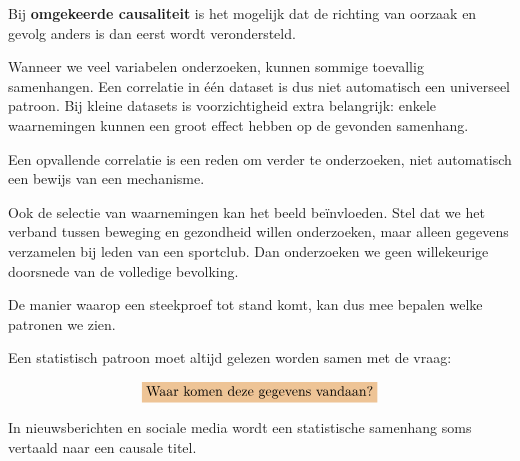 \documentclass{ximera}
\begin{document}
\begin{definitie}
Bij \textbf{omgekeerde causaliteit} is het mogelijk dat de richting
van oorzaak en gevolg anders is dan eerst wordt verondersteld.
\end{definitie}



Wanneer we veel variabelen onderzoeken, kunnen sommige toevallig
samenhangen. Een correlatie in één dataset is dus niet automatisch een universeel
patroon. Bij kleine datasets is voorzichtigheid extra belangrijk: enkele
waarnemingen kunnen een groot effect hebben op de gevonden samenhang.

\begin{opmerking}
Een opvallende correlatie is een reden om verder te onderzoeken,
niet automatisch een bewijs van een mechanisme.
\end{opmerking}



Ook de selectie van waarnemingen kan het beeld beïnvloeden. Stel dat we het verband tussen beweging en gezondheid willen
onderzoeken, maar alleen gegevens verzamelen bij leden van een
sportclub. Dan onderzoeken we geen willekeurige doorsnede van de volledige
bevolking.

De manier waarop een steekproef tot stand komt, kan dus mee bepalen
welke patronen we zien.

\begin{opmerking}
Een statistisch patroon moet altijd gelezen worden samen met de vraag:

\[
\important{
\text{Waar komen deze gegevens vandaan?}
}
\]
\end{opmerking}













In nieuwsberichten en sociale media wordt een statistische samenhang
soms vertaald naar een causale titel.
\end{document}
